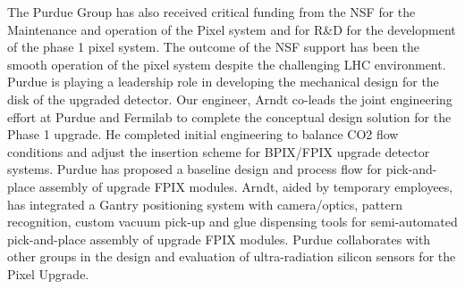 The Purdue Group has also received critical funding from the NSF for
the Maintenance and operation of the Pixel system and for R\&D for the
development of the phase 1 pixel system. The outcome of the NSF
support has been the smooth operation of the pixel system despite the
challenging LHC environment. Purdue is playing a leadership role in
developing the mechanical design for the disk of the upgraded
detector. Our engineer, Arndt co-leads the joint engineering effort at
Purdue and Fermilab to complete the conceptual design solution for the
Phase 1 upgrade. He completed initial engineering to balance CO2 flow
conditions and adjust the insertion scheme for BPIX/FPIX upgrade
detector systems. Purdue has proposed a baseline design and process
flow for pick-and-place assembly of upgrade FPIX modules. Arndt, aided
by temporary employees, has integrated a Gantry positioning system
with camera/optics, pattern recognition, custom vacuum pick-up and
glue dispensing tools for semi-automated pick-and-place assembly of
upgrade FPIX modules.  Purdue collaborates with other groups in the
design and evaluation of ultra-radiation silicon sensors for the Pixel
Upgrade.
